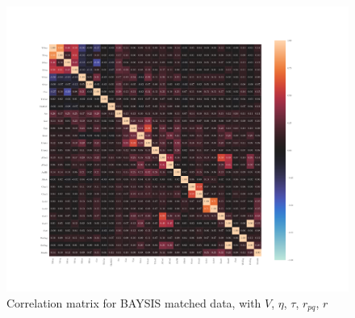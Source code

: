 	\pagestyle{empty}
	\begin{figure}[ht]
		\centering
		\includegraphics[scale=0.52, trim=3cm 2cm 0cm 0cm]{../CorrAnalysis/data/BAYSIS/02_matched/plots/baysis_matched_corr_cramers}
		\caption{Correlation matrix for BAYSIS matched data, with $V$, $\eta$, $\tau$, $r_{pq}$, $r$}
		\label{img:correlation_matrix_matched_cramers}
	\end{figure}
\restoregeometry
\pagestyle{headings}

